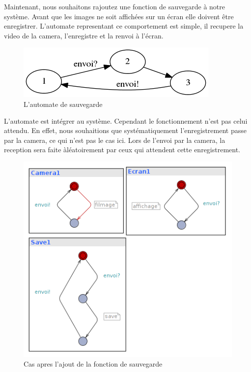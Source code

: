 \documentclass[12pt,a4paper]{report}
\begin{document}
    Maintenant, nous souhaitons rajoutez une fonction de sauvegarde à notre système. Avant que les images ne soit affichées sur un écran elle doivent être enregistrer. L'automate representant ce comportement est simple, il recupere la video de la camera, l'enregistre et la renvoi à l'écran.

\begin{figure}[h]
  \centering
  \includegraphics[scale=0.6]{ressources/save.png}
  \caption{L'automate de sauvegarde}
\end{figure} 

    L'automate est intégrer au système. Cependant le fonctionnement n'est pas celui attendu. En effet, nous souhaitions que systématiquement l'enregistrement passe par la camera, ce qui n'est pas le cas ici. Lors de l'envoi par la camera, la reception sera faite àléatoirement par ceux qui attendent cette enregistrement.\\
    
\newpage    
\begin{figure}[h]
  \centering
  \includegraphics[scale=0.6]{ressources/cameraSave.png}
  \caption{Cas apres l'ajout de la fonction de sauvegarde}
\end{figure}     
    
\end{document}
